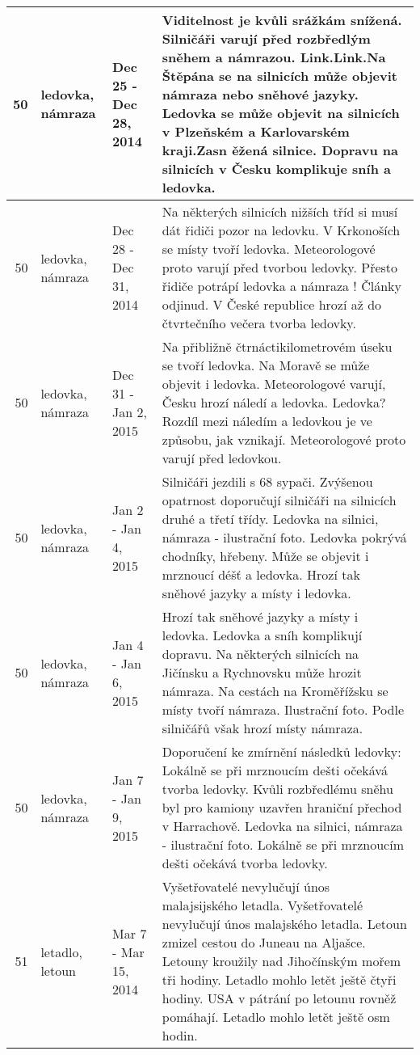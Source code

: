 \begin{tabularx}{\linewidth}{r m{2.5cm} X m{8cm}}
50 & ledovka, námraza & Dec 25 - Dec 28, 2014 & Viditelnost je kvůli srážkám snížená. Silničáři varují před rozbředlým sněhem a námrazou. Link.Link.Na Štěpána se na silnicích může objevit námraza nebo sněhové jazyky. Ledovka se může objevit na silnicích v Plzeňském a Karlovarském kraji.Zasn ěžená silnice. Dopravu na silnicích v Česku komplikuje sníh a ledovka. \\ \midrule
50 & ledovka, námraza & Dec 28 - Dec 31, 2014 & Na některých silnicích nižších tříd si musí dát řidiči pozor na ledovku. V Krkonoších se místy tvoří ledovka. Meteorologové proto varují před tvorbou ledovky. Přesto řidiče potrápí ledovka a námraza ! Články odjinud. V České republice hrozí až do čtvrtečního večera tvorba ledovky. \\ \midrule
50 & ledovka, námraza & Dec 31 - Jan 2, 2015 & Na přibližně čtrnáctikilometrovém úseku se tvoří ledovka. Na Moravě se může objevit i ledovka. Meteorologové varují, Česku hrozí náledí a ledovka. Ledovka? Rozdíl mezi náledím a ledovkou je ve způsobu, jak vznikají. Meteorologové proto varují před ledovkou. \\ \midrule
50 & ledovka, námraza & Jan 2 - Jan 4, 2015 & Silničáři jezdili s 68 sypači. Zvýšenou opatrnost doporučují silničáři na silnicích druhé a třetí třídy. Ledovka na silnici, námraza - ilustrační foto. Ledovka pokrývá chodníky, hřebeny. Může se objevit i mrznoucí déšť a ledovka. Hrozí tak sněhové jazyky a místy i ledovka. \\ \midrule
50 & ledovka, námraza & Jan 4 - Jan 6, 2015 & Hrozí tak sněhové jazyky a místy i ledovka. Ledovka a sníh komplikují dopravu. Na některých silnicích na Jičínsku a Rychnovsku může hrozit námraza. Na cestách na Kroměřížsku se místy tvoří námraza. Ilustrační foto. Podle silničářů však hrozí místy námraza. \\ \midrule
50 & ledovka, námraza & Jan 7 - Jan 9, 2015 & Doporučení ke zmírnění následků ledovky: Lokálně se při mrznoucím dešti očekává tvorba ledovky. Kvůli rozbředlému sněhu byl pro kamiony uzavřen hraniční přechod v Harrachově. Ledovka na silnici, námraza - ilustrační foto. Lokálně se při mrznoucím dešti očekává tvorba ledovky. \\ \midrule
51 & letadlo, letoun & Mar 7 - Mar 15, 2014 & Vyšetřovatelé nevylučují únos malajsijského letadla. Vyšetřovatelé nevylučují únos malajského letadla. Letoun zmizel cestou do Juneau na Aljašce. Letouny kroužily nad Jihočínským mořem tři hodiny. Letadlo mohlo letět ještě čtyři hodiny. USA v pátrání po letounu rovněž pomáhají. Letadlo mohlo letět ještě osm hodin. \\ \midrule

\end{tabularx}
